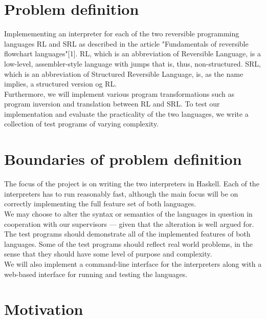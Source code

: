 \section{Problem definition}
\label{sec:problem_definition}
Implemementing an interpreter for each of the two reversible programming languages RL and SRL as described in the article "Fundamentals of reversible flowchart languages"[1]. RL, which is an abbreviation of Reversible Language, is a low-level, assembler-style language with jumps that is, thus, non-structured. SRL, which is an abbreviation of Structured Reversible Language, is, as the name implies, a structured version og RL. \\
\indent Furthermore, we will implement various program transformations such as program inversion and translation between RL and SRL. %
To test our implementation and evaluate the practicality of the two languages, we write a collection of test programs of varying complexity.

\section{Boundaries of problem definition}
\label{sec:boundaries_of_problem_definition}

The focus of the project is on writing the two interpreters in Haskell. Each of the interpreters has to run reasonably fast, although the main focus will be on correctly implementing the full feature set of both languages. \\
\indent We may choose to alter the syntax or semantics of the languages in question in cooperation with our supervisors --- given that the alteration is well argued for. \\
\indent The test programs should demonstrate all of the implemented features of both languages. Some of the test programs should reflect real world problems, in the sense that they should have some level of purpose and complexity. \\
\indent We will also implement a command-line interface for the interpreters along with a web-based interface for running and testing the languages.

\section{Motivation}
\label{sec:motivation}

